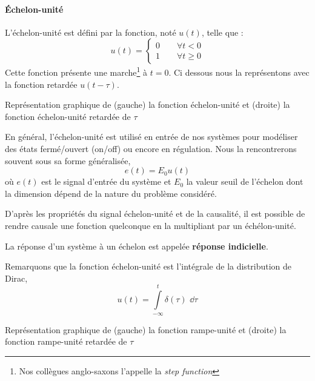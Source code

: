 \paragraph{\'Echelon-unité}
L'échelon-unité est défini par la fonction, noté $u(t)$, telle que :
\[
    u(t)=
    \begin{cases} 
    0 \qquad \forall t<0    \\ 
    1 \qquad \forall t\geq 0 
    \end{cases}
\]
Cette fonction présente une marche\footnote{Nos 
collègues anglo-saxons l'appelle la \og\emph{step function}\fg} à $t=0$. 
Ci dessous nous la représentons avec la fonction retardée $u(t-\tau)$.
\begin{marginfigure}
    \centering
    
    \caption{Représentation graphique de (gauche) la fonction échelon-unité 
             et (droite) la fonction échelon-unité retardée de $\tau$
            \label{fig-echelon}}
\end{marginfigure}
En général, l'échelon-unité est utilisé en entrée de nos systèmes pour 
modéliser des états fermé/ouvert (\og on/off\fg) ou encore en régulation.
Nous la rencontrerons souvent sous sa forme généralisée, 
\[
    e(t)=E_0u(t)
\]
où $e(t)$ est le signal d'entrée du système et $E_0$ la valeur seuil 
de l'échelon dont la dimension dépend de la nature du problème considéré.

D'après les propriétés du signal échelon-unité et de la causalité, il 
est possible de rendre causale une fonction quelconque en la 
multipliant par un échélon-unité.

La réponse d'un système à un échelon est appelée 
\textbf{réponse indicielle}.

Remarquons que la fonction échelon-unité est l'intégrale 
de la distribution de Dirac,
\[
    u(t)=\int\limits_{-\infty}^{t} \delta(\tau)\,\,\dd{\tau}
\]
\begin{marginfigure}
    \centering
    
    \caption{Représentation graphique de (gauche) la fonction rampe-unité et 
                                     (droite) la fonction rampe-unité retardée
                                     de $\tau$\label{fig-rampe}}
\end{marginfigure}
